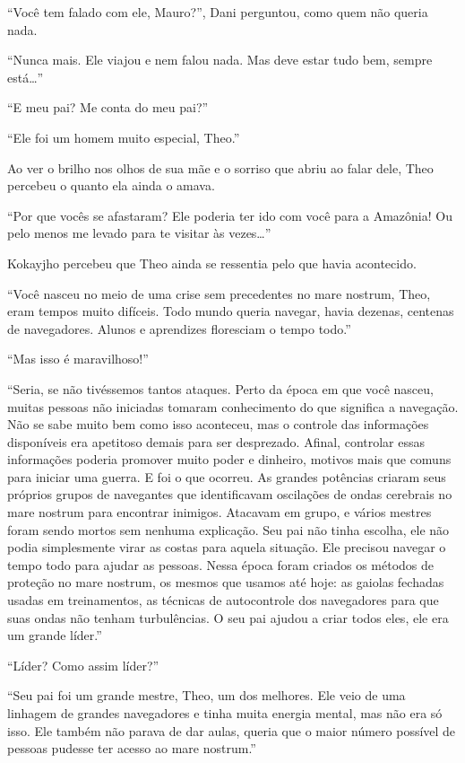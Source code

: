 ``Você tem falado com ele, Mauro?'', Dani perguntou, como quem não queria
nada.

``Nunca mais. Ele viajou e nem falou nada. Mas deve estar tudo bem,
sempre está\ldots{}''

\asterisc


``E meu pai? Me conta do meu pai?''

``Ele foi um homem muito especial, Theo.''

Ao ver o brilho nos olhos de sua mãe e o sorriso que abriu ao falar
dele, Theo percebeu o quanto ela ainda o amava.

``Por que vocês se afastaram? Ele poderia ter ido com você para a
Amazônia! Ou pelo menos me levado para te visitar às vezes\ldots{}''

Kokayjho percebeu que Theo ainda se ressentia pelo que havia acontecido.

``Você nasceu no meio de uma crise sem precedentes no mare nostrum, Theo,
eram tempos muito difíceis. Todo mundo queria navegar, havia dezenas,
centenas de navegadores. Alunos e aprendizes floresciam o tempo todo.''

``Mas isso é maravilhoso!''

``Seria, se não tivéssemos tantos ataques. Perto da época em que você
nasceu, muitas pessoas não iniciadas tomaram conhecimento do que
significa a navegação. Não se sabe muito bem como isso aconteceu, mas o
controle das informações disponíveis era apetitoso demais para ser
desprezado. Afinal, controlar essas informações poderia promover muito
poder e dinheiro, motivos mais que comuns para iniciar uma guerra. E foi
o que ocorreu. As grandes potências criaram seus próprios grupos de
navegantes que identificavam oscilações de ondas cerebrais no mare
nostrum para encontrar inimigos. Atacavam em grupo, e vários
mestres foram sendo mortos sem nenhuma explicação.
Seu pai não tinha escolha, ele não podia
simplesmente virar as costas para aquela situação. Ele precisou navegar
o tempo todo para ajudar as pessoas. Nessa época foram criados os
métodos de proteção no mare nostrum, os mesmos que usamos até hoje:
as gaiolas fechadas usadas em treinamentos, as técnicas de
autocontrole dos navegadores para que suas ondas não tenham
turbulências. O seu pai ajudou a criar todos eles, ele era um grande
líder.''

``Líder? Como assim líder?''

``Seu pai foi um grande mestre, Theo, um dos melhores. Ele veio de uma
linhagem de grandes navegadores e tinha muita energia mental, mas não
era só isso. Ele também não parava de dar aulas, queria que o maior
número possível de pessoas pudesse ter acesso ao mare nostrum.''

